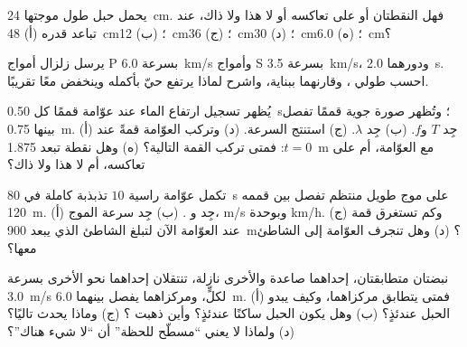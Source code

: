 \begin{exercise}[$\star\star$]\label{exo:g12:mechanical-waves:10}
يحمل حبل  طول موجتها \qty{24}{cm}. فهل النقطتان 
أو على تعاكسه أو لا هذا ولا ذاك، عند تباعد قدره (أ) \qty{48}{cm}؛
(ب) \qty{12}{cm}؛ (ج) \qty{36}{cm}؛ (د) \qty{30}{cm}؛ (ه) \qty{6.0}{cm}؟
\end{exercise}

\begin{exercise}[$\star\star$]\label{exo:g12:mechanical-waves:11}
يرسل زلزال أمواج P بسرعة \qty{6.0}{km/s} وأمواج S بسرعة
\qty{3.5}{km/s}، ودورهما \qty{2.0}{s}. احسب طولي ،
وقارنهما ببناية، واشرح لماذا يرتفع حيّ بأكمله وينخفض
معًا تقريبًا.
\end{exercise}

\begin{exercise}[$\star\star\star$]\label{exo:g12:mechanical-waves:12}
يُظهر تسجيل ارتفاع الماء عند عوّامة قممًا كل
\qty{0.50}{s}؛ وتُظهر صورة جوية قممًا تفصل بينها \qty{0.75}{m}.
(أ) جِد $T$ و$f$. (ب) جِد $\lambda$. (ج) استنتج السرعة. (د) وتركب
العوّامة قمةً عند $t = 0$: فمتى تركب القمة التالية؟ (ه) وهل نقطة تبعد \qty{1.875}{m}
 مع العوّامة، أم على تعاكسه، أم لا هذا ولا ذاك؟
\end{exercise}

\begin{exercise}[$\star\star\star$]\label{exo:g12:mechanical-waves:13}
تكمل عوّامة راسية $10$ تذبذبة كاملة في \qty{80}{s} على
موج طويل منتظم تفصل بين قممه \qty{120}{m}. (أ) جِد  و
. (ب) جِد سرعة الموج،  \unit{m/s} وبوحدة
\unit{km/h}. (ج) وكم تستغرق قمة عند العوّامة الآن لتبلغ
الشاطئ الذي يبعد \qty{900}{m}؟ (د) وهل تنجرف العوّامة إلى الشاطئ معها؟
\end{exercise}

\begin{exercise}[$\star\star\star$]\label{exo:g12:mechanical-waves:14}
نبضتان متطابقتان، إحداهما صاعدة والأخرى نازلة، تنتقلان إحداهما نحو
الأخرى بسرعة \qty{3.0}{m/s} لكلٍّ، ومركزاهما يفصل بينهما \qty{6.0}{m}. (أ) فمتى
يتطابق مركزاهما، وكيف يبدو الحبل عندئذٍ؟ (ب) وهل يكون
الحبل ساكنًا عندئذٍ؟ وأين ذهبت ؟ (ج) وماذا يحدث
تاليًا؟ (د) ولماذا لا يعني ``مسطّح للحظة'' أن ``لا شيء هناك''؟
\end{exercise}

